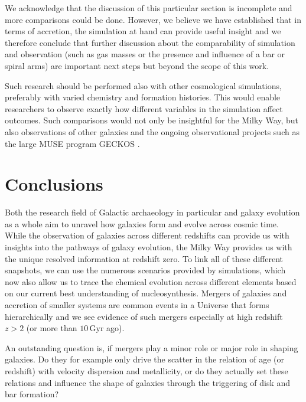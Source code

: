 \documentclass[fleqn,usenatbib]{mnras}
\begin{document}
We acknowledge that the discussion of this particular section is incomplete and more comparisons could be done. However, we believe we have established that in terms of accretion, the simulation at hand can provide useful insight and we therefore conclude that further discussion about the comparability of simulation and observation (such as gas masses or the presence and influence of a bar or spiral arms) are important next steps but beyond the scope of this work.

Such research should be performed also with other cosmological simulations, preferably with varied chemistry and formation histories. This would enable researchers to observe exactly how different variables in the simulation affect outcomes. Such comparisons would not only be insightful for the Milky Way, but also observations of other galaxies \citep[compare for example figures by][to our Fig.~\ref{fig:accretion_rate}]{Pinna2019, Pinna2019b, Martig2021} and the ongoing observational projects such as the large MUSE program GECKOS \citep{GECKOS2023}.

\section{Conclusions}
\label{sec:conc}

Both the research field of Galactic archaeology in particular and galaxy evolution as a whole aim to unravel how galaxies form and evolve across cosmic time. While the observation of galaxies across different redshifts can provide us with insights into the pathways of galaxy evolution, the Milky Way provides us with the unique resolved information at redshift zero. To link all of these different snapshots, we can use the numerous scenarios provided by simulations, which now also allow us to trace the chemical evolution across different elements based on our current best understanding of nucleosynthesis. Mergers of galaxies and accretion of smaller systems are common events in a Universe that forms hierarchically and we see evidence of such mergers especially at high redshift $z > 2$ (or more than $10\,\mathrm{Gyr}$ ago).

An outstanding question is, if mergers play a minor role or major role in shaping galaxies. Do they for example only drive the scatter in the relation of age (or redshift) with velocity dispersion and metallicity, or do they actually set these relations and influence the shape of galaxies through the triggering of disk and bar formation?
\end{document}
